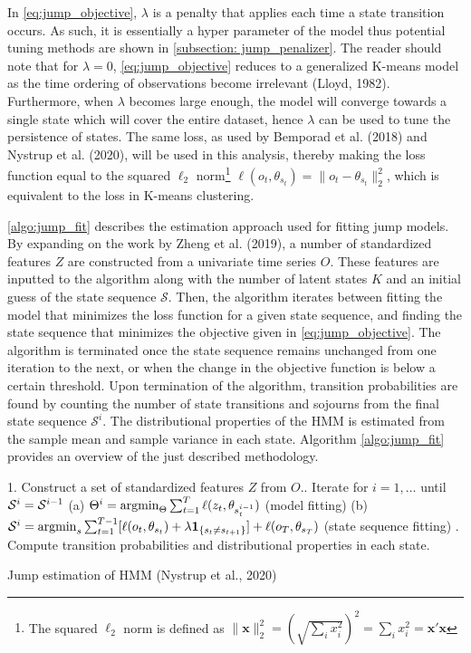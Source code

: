 In \cref{eq:jump_objective}, $\lambda$ is a penalty that applies each time a state transition occurs. As such, it is essentially a hyper parameter of the model thus potential tuning methods are shown in \cref{subsection: jump_penalizer}. The reader should note that for $\lambda=0$, \cref{eq:jump_objective} reduces to a generalized K-means model as the time ordering of observations become irrelevant (Lloyd, 1982). Furthermore, when $\lambda$ becomes large enough, the model will converge towards a single state which will cover the entire dataset, hence $\lambda$ can be used to tune the persistence of states. The same loss, as used by Bemporad et al. (2018) and Nystrup et al. (2020), will be used in this analysis, thereby making the loss function equal to the squared $\ell_2$ norm\footnote{The squared $\ell_2$ norm is defined as $\|\mathbf{x}\|_2^2 = (\sqrt{\sum_i x_i^2})^2 = \sum_i x_i^2 = \mathbf{x'x} $} $\ell(o_t, \theta_{s_t}) = \| o_t - \theta_{s_t} \|_2^2$, which is equivalent to the loss in K-means clustering.

\cref{algo:jump_fit} describes the estimation approach used for fitting jump models. By expanding on the work by Zheng et al. (2019), a number of standardized features $Z$ are constructed from a univariate time series $O$. These features are inputted to the algorithm along with the number of latent states $K$ and an initial guess of the state sequence $\mathcal{S}$. Then, the algorithm iterates between fitting the model that minimizes the loss function for a given state sequence, and finding the state sequence that minimizes the objective given in \cref{eq:jump_objective}. The algorithm is terminated once the state sequence remains unchanged from one iteration to the next, or when the change in the objective function is below a certain threshold. Upon termination of the algorithm, transition probabilities are found by counting the number of state transitions and sojourns from the final state sequence $\mathcal{S}^i$. The distributional properties of the HMM is estimated from the sample mean and sample variance in each state. Algorithm \ref{algo:jump_fit} provides an overview of the just described methodology.

\begin{algorithm}[H]
\BlankLine

1. Construct a set of standardized features $Z$ from $O$.. Iterate for $i=1,\ldots$ until $\S^i=\S^{i-1}$ \;
\Indp
(a) $\Theta^i = \argmin_{\Theta} \sum_{t=1}^T \ell(z_t, \theta_{s_t^{i-1}})$ (model fitting)\;
(b) $\S^i = \argmin_s \sum_{t=1}^{T-1} [\ell(o_t, \theta_{s_t}) + \lambda\mathbf{1}_{\{ s_t\ne s_{t+1} \}}]
    + \ell(o_T, \theta_{s_T})$ (state sequence fitting)\;
. Compute transition probabilities and distributional properties in each state.\;
\BlankLine
{}

\caption{Jump estimation of HMM (Nystrup et al., 2020)}
\label{algo:jump_fit}
\end{algorithm}

